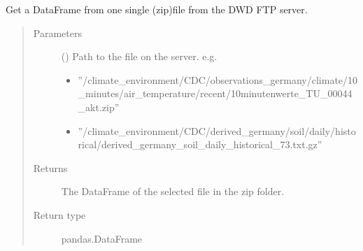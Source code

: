 \documentclass[letterpaper,10pt,english]{sphinxmanual}
\begin{document}
\begin{fulllineitems}
\label{\detokenize{weatherDB.lib.max_fun:weatherDB.lib.max_fun.import_DWD.get_dwd_file}}
\sphinxAtStartPar
Get a DataFrame from one single (zip\sphinxhyphen{})file from the DWD FTP server.
\begin{quote}\begin{description}
\item[{Parameters}] \leavevmode
\sphinxAtStartPar
{} () \textendash{} 
\sphinxAtStartPar
Path to the file on the server. e.g.
\begin{itemize}
\item {} 
\sphinxAtStartPar
”/climate\_environment/CDC/observations\_germany/climate/10\_minutes/air\_temperature/recent/10minutenwerte\_TU\_00044\_akt.zip”

\item {} 
\sphinxAtStartPar
”/climate\_environment/CDC/derived\_germany/soil/daily/historical/derived\_germany\_soil\_daily\_historical\_73.txt.gz”

\end{itemize}


\item[{Returns}] \leavevmode
\sphinxAtStartPar
The DataFrame of the selected file in the zip folder.

\item[{Return type}] \leavevmode
\sphinxAtStartPar
pandas.DataFrame

\end{description}\end{quote}

\end{fulllineitems}

\end{document}
